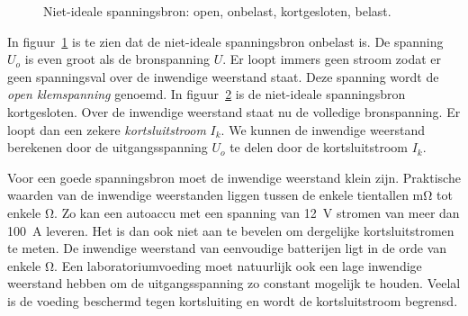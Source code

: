 \begin{figure}[!ht]
\begin{subfigure}{0.5\textwidth}
\centering
{}
\caption{}
\label{fig:gelnisopen}
\end{subfigure}%
\begin{subfigure}{0.5\textwidth}
\centering
{}
\caption{}
\label{fig:gelniskort}
\end{subfigure}
\caption{Niet-ideale spanningsbron:  open, onbelast,  kortgesloten, belast.}
\label{fig:gelnisopenkort}
\end{figure}

In figuur~\ref{fig:gelnisopen} is te zien dat de niet-ideale spanningsbron onbelast is.
De spanning $U_o$ is even groot als de bronspanning $U$. Er loopt immers geen stroom zodat
er geen spanningsval over de inwendige weerstand staat. Deze spanning wordt de \textsl{open
klemspanning} genoemd. In figuur~\ref{fig:gelniskort} is
de niet-ideale spanningsbron kortgesloten. Over de inwendige weerstand staat nu de volledige
bronspanning. Er loopt dan een zekere \textsl{kortsluitstroom} $I_k$. We kunnen de inwendige
weerstand berekenen door de uitgangsspanning $U_o$ te delen door de kortsluitstroom $I_k$.

Voor een goede spanningsbron moet de inwendige weerstand klein zijn. Praktische waarden van
de inwendige weerstanden liggen tussen de enkele tientallen \si{\milli\ohm} tot enkele \si{\ohm}.
Zo kan een autoaccu met een spanning van \SI{12}{\volt} stromen van meer dan \SI{100}{\ampere}
leveren. Het is dan
ook niet aan te bevelen om dergelijke kortsluitstromen te meten. De inwendige weerstand
van eenvoudige batterijen ligt in de orde van enkele \si{\ohm}. Een laboratoriumvoeding moet
natuurlijk ook een lage inwendige weerstand hebben om de uitgangsspanning zo constant
mogelijk te houden. Veelal is de voeding beschermd tegen kortsluiting en wordt de
kortsluitstroom begrensd.


